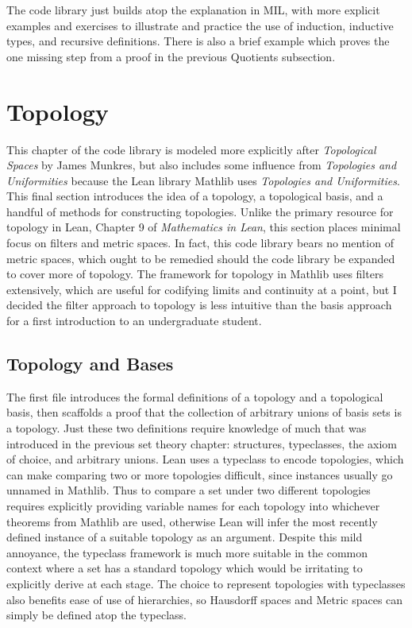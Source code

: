 The code library just builds atop the explanation in MIL, with more explicit 
examples and exercises to illustrate and practice the use of induction, 
inductive types, and recursive definitions. There is also a brief example
which proves the one missing step from a proof in the previous Quotients 
subsection.

\section{Topology}

This chapter of the code library is modeled more explicitly after 
\textit{Topological Spaces} by James Munkres, but also includes
some influence from \textit{Topologies and Uniformities} because 
the Lean library Mathlib uses \textit{Topologies and Uniformities}.
This final section introduces the idea of a topology, a topological basis,
and a handful of methods for constructing topologies. Unlike the primary 
resource for topology in Lean, Chapter 9 of \textit{Mathematics in Lean}, 
this section places minimal focus on filters and metric spaces. In fact, 
this code library bears no mention of metric spaces, which ought to
be remedied should the code library be expanded to cover more of topology.
The framework for topology in Mathlib uses filters extensively, which
are useful for codifying limits and continuity at a point, but I decided 
the filter approach to topology is less intuitive than the basis 
approach for a first introduction to an undergraduate student.

\subsection{Topology and Bases}

The first file introduces the formal definitions of a topology and a 
topological basis, then scaffolds a proof that the collection of arbitrary
unions of basis sets is a topology. Just these two definitions require 
knowledge of much that was introduced in the previous set theory chapter:
structures, typeclasses, the axiom of choice, and arbitrary unions. Lean
uses a typeclass  to encode topologies, which can 
make comparing two or more topologies difficult, since instances usually
go unnamed in Mathlib. Thus to compare a set under two different topologies
requires explicitly providing variable names for each topology into whichever
theorems from Mathlib are used, otherwise Lean will infer the most recently 
defined instance of a suitable topology as an argument. Despite this mild 
annoyance, the typeclass framework is much more suitable in the common context 
where a set has a standard topology which would be irritating to explicitly 
derive at each stage. The choice to represent topologies with typeclasses also 
benefits ease of use of hierarchies, so Hausdorff spaces and Metric spaces can 
simply be defined atop the  typeclass.

